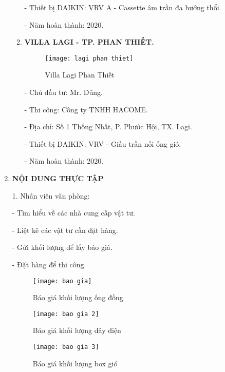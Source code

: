 \documentclass[12pt,a4paper]{article}
\begin{document}
\begin{enumerate}
\begin{enumerate}
\hspace{1cm} - Thiết bị DAIKIN: VRV A - Cassette âm trần đa hướng thổi.

\hspace{1cm} - Năm hoàn thành: 2020.

\item \textbf{VILLA LAGI - TP. PHAN THIẾT.}
\begin{figure}[htbp]
  \centering
  \texttt{[image: lagi phan thiet]}
  \caption{Villa Lagi Phan Thiết}
\end{figure}

\hspace{1cm} - Chủ đầu tư: Mr. Dũng.

\hspace{1cm} - Thi công: Công ty TNHH HACOME.

\hspace{1cm} - Địa chỉ: Số 1 Thống Nhất, P. Phước Hội, TX. Lagi.

\hspace{1cm} - Thiết bị DAIKIN: VRV - Giấu trần nối ống gió.

\hspace{1cm} - Năm hoàn thành: 2020.
\newpage

\end{enumerate}
\item \textbf{NỘI DUNG THỰC TẬP}

1. Nhân viên văn phòng:

\hspace{1cm} - Tìm hiểu về các nhà cung cấp vật tư.

\hspace{1cm} - Liệt kê các vật tư cần đặt hàng.

\hspace{1cm} - Gửi khối lượng để lấy báo giá.

\hspace{1cm} - Đặt hàng để thi công.
	
\begin{figure}[H]
  \centering
  \texttt{[image: bao gia]}
  \caption{Báo giá khối lượng ống đồng}
\end{figure}

\begin{figure}[H]
  \centering
  \texttt{[image: bao gia 2]}
  \caption{Báo giá khối lượng dây điện}
\end{figure}

\begin{figure}[H]
  \centering
  \texttt{[image: bao gia 3]}
  \caption{Báo giá khối lượng box gió}
\end{figure}


\end{enumerate}
\end{document}
